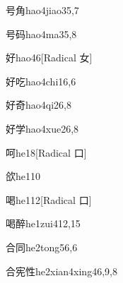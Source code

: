 \begin{entry}{号角}{hao4jiao3}{5,7}
\end{entry}

\begin{entry}{号码}{hao4ma3}{5,8}
\end{entry}

\begin{entry}{好}{hao4}{6}[Radical ⼥]
\end{entry}

\begin{entry}{好吃}{hao4chi1}{6,6}
\end{entry}

\begin{entry}{好奇}{hao4qi2}{6,8}
\end{entry}

\begin{entry}{好学}{hao4xue2}{6,8}
\end{entry}

\begin{entry}{呵}{he1}{8}[Radical 口]
\end{entry}

\begin{entry}{欱}{he1}{10}
\end{entry}

\begin{entry}{喝}{he1}{12}[Radical 口]
\end{entry}

\begin{entry}{喝醉}{he1zui4}{12,15}
\end{entry}

\begin{entry}{合同}{he2tong5}{6,6}
\end{entry}

\begin{entry}{合宪性}{he2xian4xing4}{6,9,8}
\end{entry}

